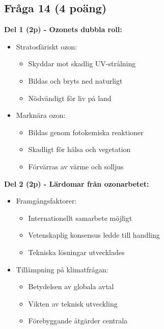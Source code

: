 \documentclass[a4paper]{article}
\begin{document}
\begin{enumerate}
\subsection*{Fråga 14 (4 poäng)}
\textbf{Del 1 (2p) - Ozonets dubbla roll:}
\begin{itemize}
\item Stratosfäriskt ozon:
  \begin{itemize}
  \item Skyddar mot skadlig UV-strålning
  \item Bildas och bryts ned naturligt
  \item Nödvändigt för liv på land
  \end{itemize}
\item Marknära ozon:
  \begin{itemize}
  \item Bildas genom fotokemiska reaktioner
  \item Skadligt för hälsa och vegetation
  \item Förvärras av värme och solljus
  \end{itemize}
\end{itemize}

\textbf{Del 2 (2p) - Lärdomar från ozonarbetet:}
\begin{itemize}
\item Framgångsfaktorer:
  \begin{itemize}
  \item Internationellt samarbete möjligt
  \item Vetenskaplig konsensus ledde till handling
  \item Tekniska lösningar utvecklades
  \end{itemize}
\item Tillämpning på klimatfrågan:
  \begin{itemize}
  \item Betydelsen av globala avtal
  \item Vikten av teknisk utveckling
  \item Förebyggande åtgärder centrala
  \end{itemize}
\end{itemize}

\end{enumerate}
\end{document}
